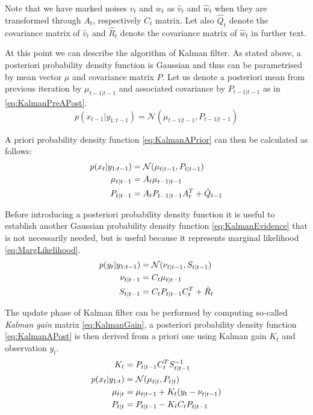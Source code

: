 \documentclass[a4paper,12pt,oneside]{report}
\newcommand{\pdf}{probability density function}
\begin{document}
Note that we have marked noises \(v_t\) and \(w_t\) as \(\hat{v}_t\) and \(\hat{w}_t\) when they
are transformed through \(A_t\), respectively \(C_t\) matrix. Let also \(\hat{Q}_t\) denote the
covariance matrix of \(\hat{v}_t\) and \(\hat{R}_t\) denote the covariance matrix of \(\hat{w}_t\)
in further text.

At this point we can describe the algorithm of Kalman filter. As stated above, a posteriori {\pdf}
is Gaussian and thus can be parametrised by mean vector \(\mu\) and covariance matrix \(P\). Let us
denote a posteriori mean from previous iteration by \(\mu_{t-1|t-1}\) and associated covariance by
\(P_{t-1|t-1}\) as in \eqref{eq:KalmanPreAPost}.
\begin{equation} \label{eq:KalmanPreAPost}
	p(x_{t-1} | y_{1:t-1}) = \mathcal{N}(\mu_{t-1|t-1}, P_{t-1|t-1})
\end{equation}

A priori {\pdf} \eqref{eq:KalmanAPrior} can then be calculated as follows:~\cite{AruMasGor:02}
\begin{align}
	p(x_t | y_{1:t-1}) &= \mathcal{N}(\mu_{t|t-1}, P_{t|t-1}) \label{eq:KalmanAPrior} \\
	\mu_{t|t-1} &= A_t \mu_{t-1|t-1} \notag \\
	P_{t|t-1} &= A_t P_{t-1|t-1} A_t^T + \hat{Q}_{t-1} \notag
\end{align}

Before introducing a posteriori {\pdf} it is useful to establish another Gaussian {\pdf}
\eqref{eq:KalmanEvidence} that is not necessarily needed, but is useful because it represents
marginal likelihood \eqref{eq:MargLikelihood}. %
\begin{align}
	p(y_t|y_{1:t-1}) &= \mathcal{N}(\nu_{t|t-1}, S_{t|t-1}) \label{eq:KalmanEvidence} \\
	\nu_{t|t-1} &= C_t \mu_{t|t-1} \notag \\
	S_{t|t-1} &= C_t P_{t|t-1} C_t^T + \hat{R}_t \notag
\end{align}

The update phase of Kalman filter can be performed by computing so-called \emph{Kalman gain} matrix
\eqref{eq:KalmanGain}, a posteriori {\pdf} \eqref{eq:KalmanAPost} is then derived from a priori one
using Kalman gain \(K_t\) and observation \(y_t\).~\cite{AruMasGor:02}
\begin{align}
	K_t &= P_{t|t-1} C_t^T S_{t|t-1}^{-1} \label{eq:KalmanGain} \\[\parskip]
	p(x_t|y_{1:t}) &= \mathcal{N}(\mu_{t|t}, P_{t|t}) \label{eq:KalmanAPost} \\
	\mu_{t|t} &= \mu_{t|t-1} + K_t(y_t - \nu_{t|t-1}) \notag \\
	P_{t|t} &= P_{t|t-1} - K_t C_t P_{t|t-1} \notag
\end{align}
\end{document}

